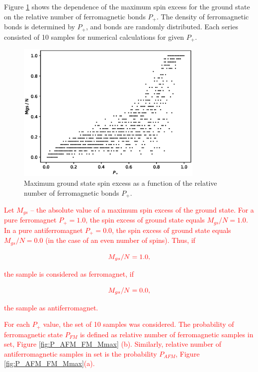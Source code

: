\documentclass[preprint,12pt]{elsarticle}
\begin{document}
	Figure \ref{fig:Mgs(P+)} shows the dependence of the maximum spin excess for the ground state on the relative number of ferromagnetic bonds $P_+$. The density of ferromagnetic bonds is determined by $P_+$, and bonds are randomly distributed. Each series consisted of 10 samples for numerical calculations for given $P_+$.
	
	\begin{figure}[H]
		\centering
		\includegraphics[width=0.8\textwidth]{images/Mgs(P+).eps}
		\caption{Maximum ground state spin excess as a function of the relative number of ferromagnetic bonds $P_+$.}
		\label{fig:Mgs(P+)}
	\end{figure}
	
	\textcolor{red}{Let $M_{gs}$ -- the absolute value of a maximum spin excess of the ground state. For a pure ferromagnet $P_+ = 1.0$, the spin excess of ground state equals $M_{gs}/N = 1.0$. In a pure antiferromagnet $P_+ = 0.0$, the spin excess of ground state equals $M_{gs}/N = 0.0$ (in the case of an even number of spins). Thus, if}
		
	\begin{equation}
		\color{red}
		M_{gs}/N = 1.0,
		\label{eq:ferr_deffinition}
	\end{equation}
		
	\textcolor{red}{\noindent the sample is considered as ferromagnet, if}
	
	\begin{equation}
		\color{red}
		M_{gs}/N = 0.0,
		\label{eq:aferr_deffinition}
	\end{equation}
	
	\textcolor{red}{\noindent the sample as antiferromagnet.}
	
	\textcolor{red}{For each $P_+$ value, the set of 10 samples was considered. The probability of ferromagnetic state $P_{FM}$ is defined as relative number of ferromagnetic samples in set, Figure \ref{fig:P_AFM_FM_Mmax} (b). Similarly, relative number of antiferromagnetic samples in set is the probability $P_{AFM}$, Figure \ref{fig:P_AFM_FM_Mmax}(a).}
	
\end{document}
